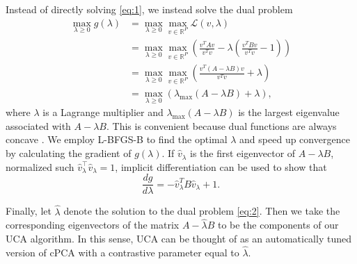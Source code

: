 \documentclass[10pt]{article}
\begin{document}
Instead of directly solving \eqref{eq:1}, we instead solve the dual problem
\begin{align}
  \max_{\lambda \geq 0}{g(\lambda)} &= \max_{\lambda \geq 0}{\max_{v\in \mathbb{R}^P}{\mathcal{L}}}\left(v,\lambda\right) \nonumber\\
                                    &= \max_{\lambda \geq 0}{\max_{v\in \mathbb{R}^P}{\left( \frac{v^TAv}{v^T v} - \lambda\left(\frac{v^TBv}{v^T v} - 1\right)\right)}} \nonumber\\
                                    &= \max_{\lambda \geq 0}{\max_{v\in \mathbb{R}^P}{\left(\frac{v^T\left(A - \lambda B\right)v}{v^T v} + \lambda\right)}}\nonumber\\
                                        &= \max_{\lambda \geq 0}{\left(\lambda_{\text{max}}\left(A - \lambda B\right) + \lambda\right)}, \label{eq:2}
\end{align}
where $\lambda$ is a Lagrange multiplier and $\lambda_{\max}(A - \lambda B)$ is the largest eigenvalue associated with $A - \lambda B$. This is convenient because dual functions are always concave \cite{boyd2004convex}. We employ L-BFGS-B \cite{byrd1995limited} to find the optimal $\lambda$ and speed up convergence by calculating the gradient of $g(\lambda)$. If $\hat{v}_\lambda$ is the first eigenvector of $A - \lambda B$, normalized such $\hat{v}_{\lambda}^\top \hat{v}_{\lambda} = 1$, implicit differentiation can be used to show that
\[
  \frac{d g}{d \lambda} = - \hat{v}^T _{\lambda} B \hat{v}_{\lambda} + 1.
\]

Finally, let $\hat{\lambda}$ denote the solution to the dual problem \eqref{eq:2}. Then we take the corresponding eigenvectors of the matrix $A - \hat{\lambda} B$ to be the components of our UCA algorithm. In this sense, UCA can be thought of as an automatically tuned version of cPCA with a contrastive parameter equal to $\hat{\lambda}$.



\end{document}
